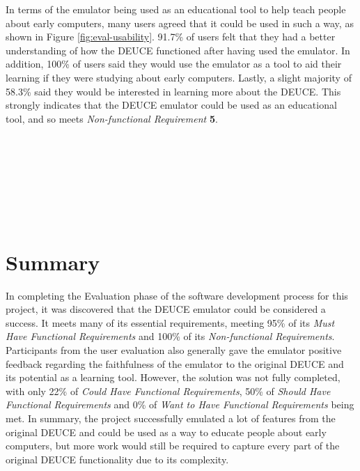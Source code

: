 \documentclass{l4proj}
\begin{document}
In terms of the emulator being used as an educational tool to help teach people about early computers, many users agreed that it could be used in such a way, as shown in Figure \ref{fig:eval-usability}. 91.7\% of users felt that they had a better understanding of how the DEUCE functioned after having used the emulator. In addition, 100\% of users said they would use the emulator as a tool to aid their learning if they were studying about early computers. Lastly, a slight majority of 58.3\% said they would be interested in learning more about the DEUCE. This strongly indicates that the DEUCE emulator could be used as an educational tool, and so meets \textit{Non-functional Requirement} \textbf{5}. \\ \\ \\ \\ \\ \\ \\ \\


\section{Summary}
In completing the Evaluation phase of the software development process for this project, it was discovered that the DEUCE emulator could be considered a success. It meets many of its essential requirements, meeting 95\% of its \textit{Must Have Functional Requirements} and 100\% of its \textit{Non-functional Requirements}. Participants from the user evaluation also generally gave the emulator positive feedback regarding the faithfulness of the emulator to the original DEUCE and its potential as a learning tool. However, the solution was not fully completed, with only 22\% of \textit{Could Have Functional Requirements}, 50\% of \textit{Should Have Functional Requirements} and 0\% of \textit{Want to Have Functional Requirements} being met. In summary, the project successfully emulated a lot of features from the original DEUCE and could be used as a way to educate people about early computers, but more work would still be required to capture every part of the original DEUCE functionality due to its complexity.

\end{document}

